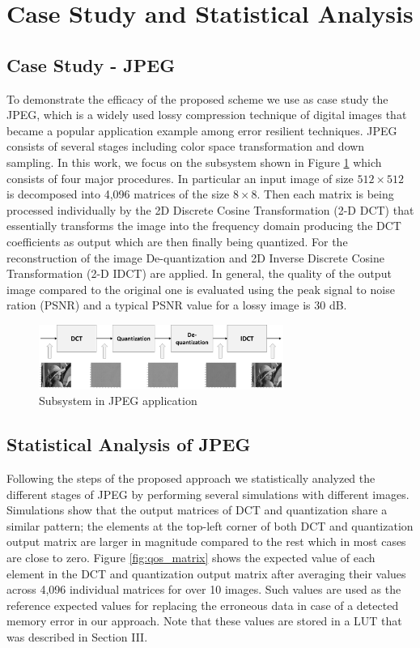 \section{Case Study and Statistical Analysis} \label{sec:app}

\subsection{Case Study - JPEG}
To demonstrate the efficacy of the proposed scheme we use as case study the JPEG, which is a widely used    
lossy compression technique of digital images that became a popular application example among error resilient techniques.  
JPEG consists of several stages including color space transformation and down sampling. In this work, we focus on the subsystem shown in Figure \ref{fig:qos_jpeg} which consists of four major procedures. In particular an input image of size $512 \times 512$
is decomposed into 4,096 matrices of the size $8 \times 8$. Then each matrix is being processed individually by the 2D Discrete Cosine Transformation (2-D DCT) \cite{gonzalez2009digital} that essentially  transforms the image into the frequency domain producing the DCT coefficients as output which are then finally being quantized. For the reconstruction of the image De-quantization and 2D Inverse Discrete Cosine Transformation (2-D IDCT) are applied. In general, the quality of the output image compared to the original one is evaluated using the peak signal to noise ration (PSNR) \cite{huynh2008scope} and a typical PSNR value for a lossy image is 30 dB. 

\begin{figure}
\centering
\includegraphics[width=80mm]{./eps/qos_jpeg}
\caption{Subsystem in JPEG application}
\vspace{-4mm}
\label{fig:qos_jpeg}
\end{figure}

\subsection{Statistical Analysis of JPEG}
Following the steps of the proposed approach we statistically analyzed the different stages of JPEG by performing several simulations with different images. Simulations show that the output matrices of DCT and quantization share a similar pattern; the elements at the top-left corner of both DCT and quantization output matrix are larger in magnitude compared to the rest which in most cases are close to zero. Figure \ref{fig:qos_matrix} shows the expected value of each element in the DCT and quantization 
output matrix after averaging their values across 4,096 individual matrices for over 10 images. Such values are used as the reference expected values for replacing the erroneous data in case of a detected memory error in our approach. Note that these values are stored in a LUT that was described in Section III. 

